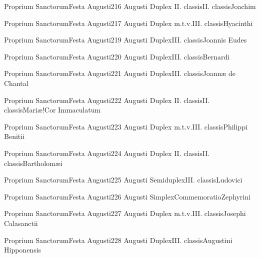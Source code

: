 \documentclass[liber-responsorialis.tex]{subfiles}
\begin{document}
	{Proprium Sanctorum}{Festa Augusti}{2}{16 Augusti}
	{Duplex II. classis}{II. classis}{Joachim}
	{}
	{}
\rubric{\conprubric}

	{Proprium Sanctorum}{Festa Augusti}{2}{17 Augusti}
	{Duplex m.t.v.}{III. classis}{Hyacinthi}
	{\conprubric}
	{\respdetemp}

	{Proprium Sanctorum}{Festa Augusti}{2}{19 Augusti}
	{Duplex}{III. classis}{Joannis Eudes}
	{\conprubric}
	{\respdetemp}

	{Proprium Sanctorum}{Festa Augusti}{2}{20 Augusti}
	{Duplex}{III. classis}{Bernardi}
	{\conpdorubric}
	{\respdetemp}

	{Proprium Sanctorum}{Festa Augusti}{2}{21 Augusti}
	{Duplex}{III. classis}{Joannæ de Chantal}
	{\nnrubric}
	{\respdetemp}

	{Proprium Sanctorum}{Festa Augusti}{2}{22 Augusti}
	{Duplex II. classis}{II. classis}{Mariæ!Cor Immaculatum}
	{}
	{}
\rubric{\cbmvrubric}

	{Proprium Sanctorum}{Festa Augusti}{2}{23 Augusti}
	{Duplex m.t.v.}{III. classis}{Philippi Benitii}
	{\conprubric}
	{\respdetemp}

	{Proprium Sanctorum}{Festa Augusti}{2}{24 Augusti}
	{Duplex II. classis}{II. classis}{Bartholomæi}
	{}
	{}
\rubric{\apexrubric}

	{Proprium Sanctorum}{Festa Augusti}{2}{25 Augusti}
	{Semiduplex}{III. classis}{Ludovici}
	{\conprubric}
	{\respdetemp}

	{Proprium Sanctorum}{Festa Augusti}{2}{26 Augusti}
	{Simplex}{Commemoratio}{Zephyrini}
	{}
	{}
\rubric{\respdetemp}

	{Proprium Sanctorum}{Festa Augusti}{2}{27 Augusti}
	{Duplex m.t.v.}{III. classis}{Josephi Calasanctii}
	{\conprubric}
	{\respdetemp}

	{Proprium Sanctorum}{Festa Augusti}{2}{28 Augusti}
	{Duplex}{III. classis}{Augustini Hipponensis}
	{\copodorubric}
	{\respdetemp}
\end{document}
